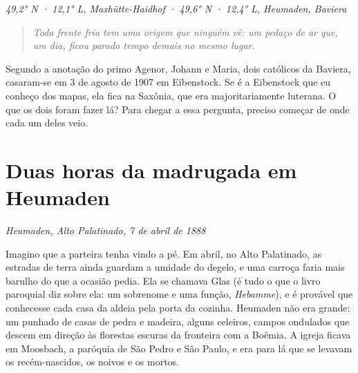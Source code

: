 \documentclass[
  brazilian,
  11pt,
  openany]{book}
\begin{document}
\emph{49,2° N · 12,1° L, Maxhütte-Haidhof · 49,6° N · 12,4° L, Heumaden,
Baviera}

\begin{quote}
\emph{Toda frente fria tem uma origem que ninguém vê: um pedaço de ar
que, um dia, ficou parado tempo demais no mesmo lugar.}
\end{quote}

Segundo a anotação do primo Agenor, Johann e Maria, dois católicos da
Baviera, casaram-se em 3 de agosto de 1907 em Eibenstock. Se é a
Eibenstock que eu conheço dos mapas, ela fica na Saxônia, que era
majoritariamente luterana. O que os dois foram fazer lá? Para chegar a
essa pergunta, preciso começar de onde cada um deles veio.

\section{Duas horas da madrugada em
Heumaden}\label{duas-horas-da-madrugada-em-heumaden}

\emph{Heumaden, Alto Palatinado, 7 de abril de 1888}

Imagino que a parteira tenha vindo a pé. Em abril, no Alto Palatinado,
as estradas de terra ainda guardam a umidade do degelo, e uma carroça
faria mais barulho do que a ocasião pedia. Ela se chamava Glas (é tudo o
que o livro paroquial diz sobre ela: um sobrenome e uma função,
\emph{Hebamme}), e é provável que conhecesse cada casa da aldeia pela
porta da cozinha. Heumaden não era grande: um punhado de casas de pedra
e madeira, alguns celeiros, campos ondulados que descem em direção às
florestas escuras da fronteira com a Boêmia. A igreja ficava em
Moosbach, a paróquia de São Pedro e São Paulo, e era para lá que se
levavam os recém-nascidos, os noivos e os mortos.
\end{document}

